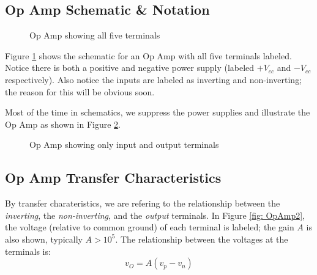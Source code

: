 \documentclass{handout}
\begin{document}
\newpage
\clearpage
\pagebreak

\subsection{Op Amp Schematic \& Notation}
\begin{figure} [h! t! b!]
\centering
{}
\caption{Op Amp showing all five terminals}
\label{fig: FullOpAmp}
\end{figure}

Figure \ref{fig: FullOpAmp} shows the schematic for an Op Amp with all five terminals labeled.  Notice there is both a positive and negative power supply (labeled $+V_{cc}$ and $-V_{cc}$ respectively).  Also notice the inputs are labeled as inverting and non-inverting; the reason for this will be obvious soon.

Most of the time in schematics, we suppress the power supplies and illustrate the Op Amp as shown in Figure \ref{fig: OpAmp}.
\begin{figure} [h! t! b!]
\centering
{}
\caption{Op Amp showing only input and output terminals}
\label{fig: OpAmp}
\end{figure}

\subsection{Op Amp Transfer Characteristics}
By transfer charateristics, we are refering to the relationship between the {\em inverting}, the {\em non-inverting}, and the {\em output} terminals.  In Figure \ref{fig: OpAmp2}, the voltage (relative to common ground) of each terminal is labeled; the gain $A$  is also shown, typically $A>10^5$.  The relationship between the voltages at the terminals is:
\begin{equation}
v_O=A(v_p-v_n)
\end{equation}
\end{document}

